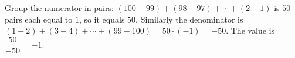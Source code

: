 Group the numerator in pairs: $(100-99)+(98-97)+\cdots+(2-1)$ is $50$ pairs each equal to $1$, so it equals $50$. Similarly the denominator is $(1-2)+(3-4)+\cdots+(99-100)=50\cdot(-1)=-50$. The value is $\dfrac{50}{-50}=\boxed{-1}$.

